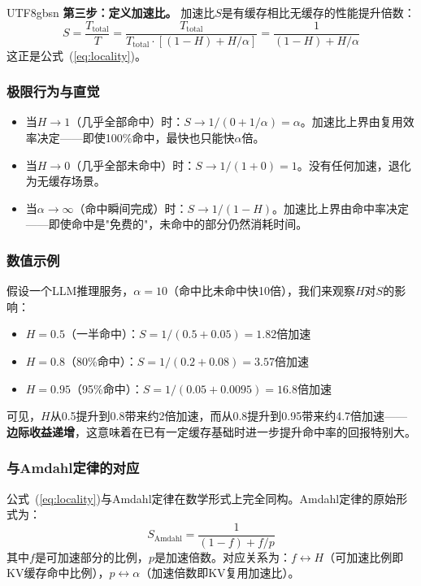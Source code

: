 \documentclass[11pt,a4paper]{article}
\begin{document}
\begin{CJK*}{UTF8}{gbsn}
\textbf{第三步：定义加速比。}
加速比$S$是有缓存相比无缓存的性能提升倍数：
\begin{equation}
S = \frac{T_{\mathrm{total}}}{T} = \frac{T_{\mathrm{total}}}{T_{\mathrm{total}} \cdot \left[(1-H) + H/\alpha\right]} = \frac{1}{(1-H) + H/\alpha}
\end{equation}
这正是公式~(\ref{eq:locality})。

\subsubsection{极限行为与直觉}

\begin{itemize}[nosep]
\item 当$H \to 1$（几乎全部命中）时：$S \to 1/(0 + 1/\alpha) = \alpha$。加速比上界由复用效率决定——即使100\%命中，最快也只能快$\alpha$倍。
\item 当$H \to 0$（几乎全部未命中）时：$S \to 1/(1 + 0) = 1$。没有任何加速，退化为无缓存场景。
\item 当$\alpha \to \infty$（命中瞬间完成）时：$S \to 1/(1-H)$。加速比上界由命中率决定——即使命中是"免费的"，未命中的部分仍然消耗时间。
\end{itemize}

\subsubsection{数值示例}

假设一个LLM推理服务，$\alpha = 10$（命中比未命中快10倍），我们来观察$H$对$S$的影响：

\begin{itemize}[nosep]
\item $H = 0.5$（一半命中）：$S = 1/(0.5 + 0.05) = 1.82$倍加速
\item $H = 0.8$（80\%命中）：$S = 1/(0.2 + 0.08) = 3.57$倍加速
\item $H = 0.95$（95\%命中）：$S = 1/(0.05 + 0.0095) = 16.8$倍加速
\end{itemize}

可见，$H$从0.5提升到0.8带来约2倍加速，而从0.8提升到0.95带来约4.7倍加速——\textbf{边际收益递增}，这意味着在已有一定缓存基础时进一步提升命中率的回报特别大。

\subsubsection{与Amdahl定律的对应}

公式~(\ref{eq:locality})与Amdahl定律在数学形式上完全同构。Amdahl定律的原始形式为：
\begin{equation}
S_{\mathrm{Amdahl}} = \frac{1}{(1-f) + f/p}
\end{equation}
其中$f$是可加速部分的比例，$p$是加速倍数。对应关系为：$f \leftrightarrow H$（可加速比例即KV缓存命中比例），$p \leftrightarrow \alpha$（加速倍数即KV复用加速比）。


\end{CJK*}
\end{document}
